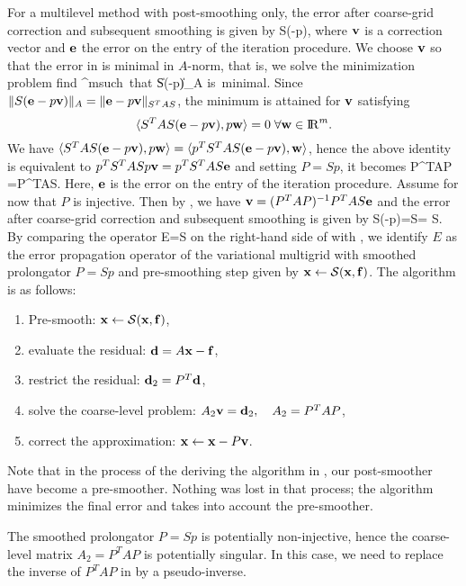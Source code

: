 For a multilevel method with post-smoothing only, the
error after coarse-grid correction and subsequent smoothing is
given by
       S(-p),
\qe
where ${\bf v}$ is a correction vector and ${\bf e}$ the error on the entry
of the iteration  procedure. We choose ${\bf v}$ so that
the error in  is minimal in $A$-norm,
that is, we solve the minimization
problem
   \mbox{find}\; \in \Re^m\;\mbox{such that} \;
   \|S(-p)\|_A \;\mbox{is minimal}.
\qe
Since $\|S({\bf e}-p{\bf v})\|_A=\|{\bf e}-p{\bf v}\|_{S^TAS}$,
the minimum is attained for ${\bf v}$ satisfying
$$
 \langle S^TAS({\bf e}-p{\bf v}),p{\bf w} \rangle = 0\;
 \forall {\bf w} \in {\rm I\negthinspace R}^m.
$$
We have $\langle S^TAS({\bf e}-p{\bf v}),p{\bf w} \rangle =
 \langle p^TS^TAS({\bf e}-p{\bf v}),{\bf w}\rangle$,
hence the above identity is equivalent to $p^TS^TASp{\bf v} = p^TS^TAS{\bf e}$
and setting $P=Sp$, it becomes
  P^TAP  =P^TAS.
\qe
Here, ${\bf e}$ is the error on the entry of the iteration procedure.
Assume for now that $P$ is injective.
Then by , we have
${\bf v}=(P^TAP)^{-1}P^TAS{\bf e}$ and the error after coarse-grid correction
and subsequent smoothing is given by
     S(-p)=S =
      S.
\qe
By comparing the operator
    E= S
\qe
on the right-hand side
of  with , we identify $E$ as the error propagation
operator
of the variational multigrid with smoothed
prolongator $P=Sp$ and pre-smoothing
step given by ${\bf x} \leftarrow {\mathcal S}({\bf x},{\bf f})$.
The algorithm is as follows:
\begin{algorithm}
\label{alg-SMA}
\quad
\begin{enumerate}
\item Pre-smooth: ${\bf x} \leftarrow {\mathcal S}({\bf x},{\bf f})$,
\item evaluate the residual: ${\bf d}=A{\bf x}-{\bf f}$,
\item restrict the residual: ${\bf d}_2 = P^T{\bf d}$,
\item solve the coarse-level problem:
      $A_2 {\bf v} = {\bf d}_2,\quad A_2 = P^TAP$,
\item correct the approximation:
      ${\bf x}\leftarrow {\bf x} - P{\bf v}$.
\end{enumerate}
\end{algorithm}

\begin{note}
Note that in the process of the deriving the algorithm in ,
our post-smoother have become a pre-smoother. Nothing was lost in that
process; the algorithm minimizes the final error and takes into account
the pre-smoother.
\end{note}
\begin{note}
The smoothed prolongator $P=Sp$ is potentially non-injective, hence the
coarse-level matrix $A_2=P^TAP$ is potentially singular. In this case,
we need to replace the inverse of $P^TAP$ in  by a
pseudo-inverse.
\end{note}

